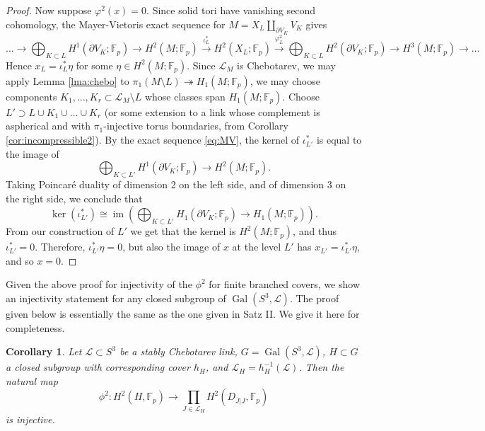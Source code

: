 \documentclass{amsart}
\theoremstyle{plain}
\theoremstyle{definition}
\theoremstyle{plain}
\theoremstyle{plain}
\newtheorem{corollary}[theorem]{Corollary}
\theoremstyle{plain}
\theoremstyle{remark}
\theoremstyle{remark}
\theoremstyle{plain}
\theoremstyle{definition}
\theoremstyle{plain}
\DeclareMathOperator{\Gal}{\mathrm{Gal}}
\DeclareMathOperator{\im}{\mathrm{im}}
\theoremstyle{plain}
\theoremstyle{plain}
\numberwithin{equation}{section}
\begin{document}
\begin{proof}
Now suppose $\varphi^2(x) = 0$. Since solid tori have vanishing second cohomology, the Mayer-Vietoris exact sequence for $M=X_L\coprod_{\partial V_K} V_K$ gives 
\begin{equation}\label{eq:MV}
    \dots \to \bigoplus_{K \subset L}H^1(\partial V_K; \mathbb F_p) \to H^2(M; \mathbb F_p) \xrightarrow{\iota_L^*}H^2(X_L; \mathbb F_p) \xrightarrow{\varphi_L^2} \bigoplus_{K \subset L}H^2(\partial V_K; \mathbb F_p) \to H^3(M; \mathbb F_p) \to \dots
\end{equation}
Hence $x_L = \iota_L^*\eta$ for some $\eta \in H^2(M; \mathbb F_p)$. Since $\mathcal L_M$ is Chebotarev, we may apply Lemma \ref{lma:chebo} to $\pi_1(M \setminus L) \twoheadrightarrow H_1(M; \mathbb F_p)$, we may choose components $K_1, \dots, K_r \subset \mathcal L_M \setminus L$ whose classes span $H_1(M; \mathbb F_p)$. Choose $L' \supset L \cup K_1 \cup \dots \cup K_r$ (or some extension to a link whose complement is aspherical and with $\pi_1$-injective torus boundaries, from Corollary \ref{cor:incompressible2}). By the exact sequence \ref{eq:MV}, the kernel of $\iota^*_{L'}$ is equal to the image of \[\bigoplus_{K \subset L'}H^1(\partial V_K; \mathbb F_p) \to H^2(M; \mathbb F_p).\] Taking Poincar\'e duality of dimension 2 on the left side, and of dimension 3 on the right side, we conclude that \[\ker(\iota^*_{L'})\cong \im (\bigoplus_{K \subset L'}H_1(\partial V_K; \mathbb F_p) \to H_1(M; \mathbb F_p)).\] From our construction of $L'$ we get that the kernel is $H^2(M; \mathbb F_p)$, and thus $\iota_{L'}^* = 0$. Therefore, $\iota_{L'}^*\eta = 0$, but also the image of $x$ at the level $L'$ has $x_{L'}=\iota_{L'}^*\eta$, and so $x = 0$. 
\end{proof}

Given the above proof for injectivity of the $\phi^2$ for finite branched covers, we show an injectivity statement for any closed subgroup of $\Gal (S^3,\mathcal{L})$. The proof given below is essentially the same as the one given in \cite{neukirch1968algebraische} Satz II. We give it here for completeness.

\begin{corollary}\label{cor:geninjective}
Let $\mathcal{L} \subset S^3$ be a stably Chebotarev link, $G = \Gal(S^3, \mathcal{L})$, $H \subset G$ a closed subgroup with corresponding cover $h_H$, and $\mathcal{L}_H = h_H^{-1}(\mathcal{L})$. Then the natural map
\begin{equation}
    \phi^2: H^2(H, \mathbb{F}_p) \rightarrow \prod_{J \in \mathcal{L}_H}H^2(D_{\overline{J}|J}, \mathbb{F}_p)
\end{equation}
is injective.
\end{corollary}
\end{document}
